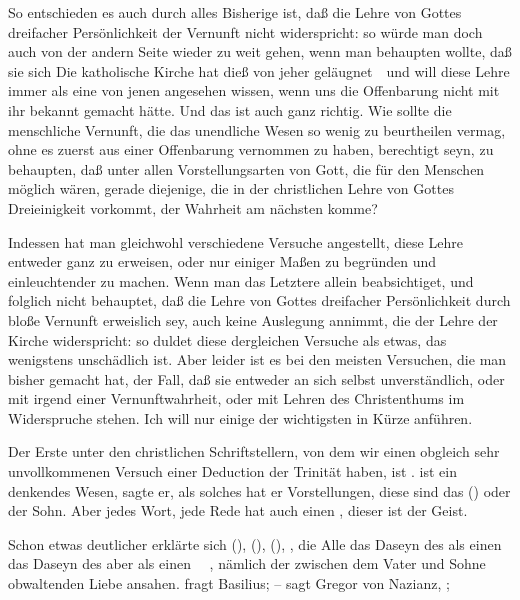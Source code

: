 \begin{aufza}
\item So entschieden es auch durch alles Bisherige ist, daß die Lehre von Gottes dreifacher Persönlichkeit der Vernunft nicht widerspricht: so würde man doch auch von der andern Seite wieder zu weit gehen, wenn man behaupten wollte, daß sie sich  Die katholische Kirche hat dieß von jeher geläugnet~\ und will diese Lehre immer als eine von jenen  angesehen wissen,  wenn uns die Offenbarung nicht mit ihr bekannt gemacht hätte. Und das ist auch ganz richtig. Wie sollte die menschliche Vernunft, die das unendliche Wesen so wenig zu beurtheilen vermag, ohne es zuerst aus einer Offenbarung vernommen zu haben, berechtigt seyn, zu behaupten, daß unter allen Vorstellungsarten von Gott, die für den Menschen möglich wären, gerade diejenige, die in der christlichen Lehre von Gottes Dreieinigkeit vorkommt, der Wahrheit am nächsten komme?
\item Indessen hat man gleichwohl verschiedene Versuche angestellt, diese Lehre entweder ganz zu erweisen, oder nur einiger Maßen zu begründen und einleuchtender zu machen. Wenn man das Letztere allein beabsichtiget, und folglich nicht behauptet, daß die Lehre von Gottes dreifacher Persönlichkeit durch bloße Vernunft erweislich sey, auch keine Auslegung annimmt, die der Lehre der Kirche widerspricht: so duldet diese dergleichen Versuche als etwas, das wenigstens unschädlich ist. Aber leider ist es bei den meisten Versuchen, die man bisher gemacht hat, der Fall, daß sie entweder an sich selbst unverständlich, oder mit irgend einer Vernunftwahrheit, oder mit Lehren des Christenthums im Widerspruche stehen. Ich will nur einige der wichtigsten in Kürze anführen.
\begin{aufzb}
\item Der Erste unter den christlichen Schriftstellern, von dem wir einen obgleich sehr unvollkommenen Versuch einer Deduction der Trinität haben, ist .  ist ein denkendes Wesen, sagte er, als solches hat er Vorstellungen, diese sind das  () oder der Sohn. Aber jedes Wort, jede Rede hat auch einen , dieser ist der Geist.
\item Schon etwas deutlicher erklärte sich  (),  (),  (), \uA , die Alle das Daseyn des  als einen  das Daseyn des  aber als einen ~\ , nämlich der zwischen dem Vater und Sohne obwaltenden Liebe ansahen.  fragt Basilius;  --  sagt Gregor von Nazianz, ; \udgl\ 

\end{aufzb}
\end{aufza}
